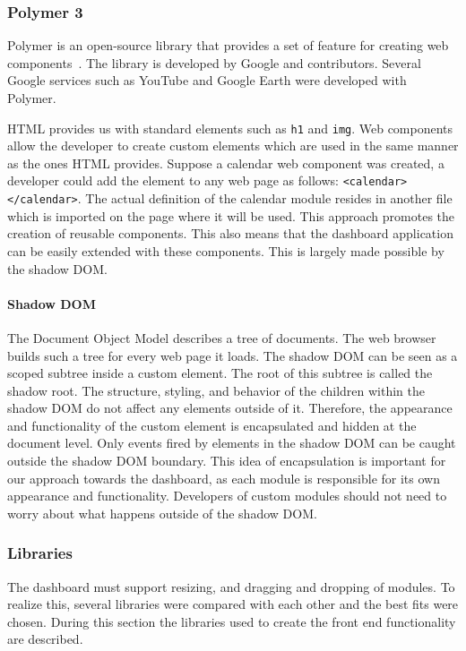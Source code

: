         \subsubsection{Polymer 3}

        Polymer is an open-source library that provides a set of feature for creating web components~\cite{Polymer}. The library is developed by Google and contributors. Several Google services such as YouTube and Google Earth were developed with Polymer.

        HTML provides us with standard elements such as \texttt{h1} and \texttt{img}. Web components allow the developer to create custom elements which are used in the same manner as the ones HTML provides. Suppose a calendar web component was created, a developer could add the element to any web page as follows: \texttt{<calendar></calendar>}. The actual definition of the calendar module resides in another file which is imported on the page where it will be used. This approach promotes the creation of reusable components. This also means that the dashboard application can be easily extended with these components. This is largely made possible by the shadow DOM\@.

        \paragraph{Shadow DOM} The Document Object Model describes a tree of documents. The web browser builds such a tree for every web page it loads. The shadow DOM can be seen as a scoped subtree inside a custom element. The root of this subtree is called the shadow root. The structure, styling, and behavior of the children within the shadow DOM do not affect any elements outside of it. Therefore, the appearance and functionality of the custom element is encapsulated and hidden at the document level. Only events fired by elements in the shadow DOM can be caught outside the shadow DOM boundary. This idea of encapsulation is important for our approach towards the dashboard, as each module is responsible for its own appearance and functionality. Developers of custom modules should not need to worry about what happens outside of the shadow DOM\@.

        \subsubsection{Libraries}

        The dashboard must support resizing, and dragging and dropping of modules. To realize this, several libraries were compared with each other and the best fits were chosen. During this section the libraries used to create the front end functionality are described.

